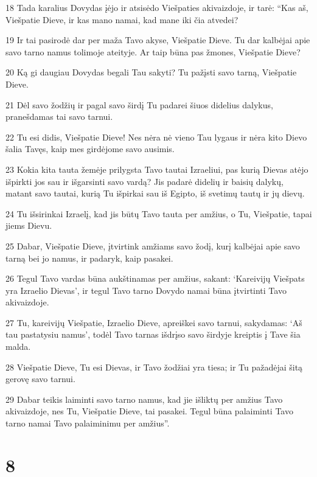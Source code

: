 \par 18 Tada karalius Dovydas įėjo ir atsisėdo Viešpaties akivaizdoje, ir tarė: “Kas aš, Viešpatie Dieve, ir kas mano namai, kad mane iki čia atvedei? 
\par 19 Ir tai pasirodė dar per maža Tavo akyse, Viešpatie Dieve. Tu dar kalbėjai apie savo tarno namus tolimoje ateityje. Ar taip būna pas žmones, Viešpatie Dieve? 
\par 20 Ką gi daugiau Dovydas begali Tau sakyti? Tu pažįsti savo tarną, Viešpatie Dieve. 
\par 21 Dėl savo žodžių ir pagal savo širdį Tu padarei šiuos didelius dalykus, pranešdamas tai savo tarnui. 
\par 22 Tu esi didis, Viešpatie Dieve! Nes nėra nė vieno Tau lygaus ir nėra kito Dievo šalia Tavęs, kaip mes girdėjome savo ausimis. 
\par 23 Kokia kita tauta žemėje prilygsta Tavo tautai Izraeliui, pas kurią Dievas atėjo išpirkti jos sau ir išgarsinti savo vardą? Jis padarė didelių ir baisių dalykų, matant savo tautai, kurią Tu išpirkai sau iš Egipto, iš svetimų tautų ir jų dievų. 
\par 24 Tu išsirinkai Izraelį, kad jis būtų Tavo tauta per amžius, o Tu, Viešpatie, tapai jiems Dievu. 
\par 25 Dabar, Viešpatie Dieve, įtvirtink amžiams savo žodį, kurį kalbėjai apie savo tarną bei jo namus, ir padaryk, kaip pasakei. 
\par 26 Tegul Tavo vardas būna aukštinamas per amžius, sakant: ‘Kareivijų Viešpats yra Izraelio Dievas’, ir tegul Tavo tarno Dovydo namai būna įtvirtinti Tavo akivaizdoje. 
\par 27 Tu, kareivijų Viešpatie, Izraelio Dieve, apreiškei savo tarnui, sakydamas: ‘Aš tau pastatysiu namus’, todėl Tavo tarnas išdrįso savo širdyje kreiptis į Tave šia malda. 
\par 28 Viešpatie Dieve, Tu esi Dievas, ir Tavo žodžiai yra tiesa; ir Tu pažadėjai šitą gerovę savo tarnui. 
\par 29 Dabar teikis laiminti savo tarno namus, kad jie išliktų per amžius Tavo akivaizdoje, nes Tu, Viešpatie Dieve, tai pasakei. Tegul būna palaiminti Tavo tarno namai Tavo palaiminimu per amžius”.



\chapter{8}

